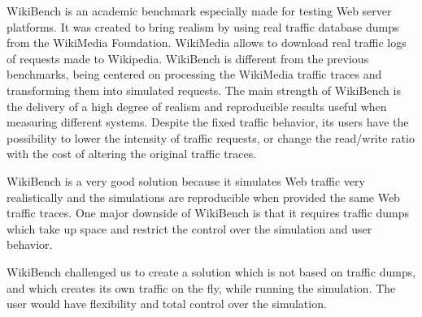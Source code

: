 WikiBench \cite{RUBBoS-website} is an academic benchmark especially made for testing Web server platforms. It was created to bring realism by using real traffic database dumps from the WikiMedia Foundation. WikiMedia allows to download real traffic logs of requests made to Wikipedia.  WikiBench is different from the previous benchmarks, being centered on processing the WikiMedia traffic traces and transforming them into simulated requests. The main strength of WikiBench is the delivery of a high degree of realism and reproducible results useful when measuring different systems. Despite the fixed traffic behavior, its users have the possibility to lower the intensity of traffic requests, or change the read/write ratio with the cost of altering the original traffic traces.

WikiBench is a very good solution because it simulates Web traffic very realistically and the simulations are reproducible when provided the same Web traffic traces. One major downside of WikiBench is that it requires traffic dumps which take up space and restrict the control over the simulation and user behavior.

WikiBench challenged us to create a solution which is not based on traffic dumps, and which creates its own traffic on the fly, while running the simulation. The user would have flexibility and total control over the simulation. 
